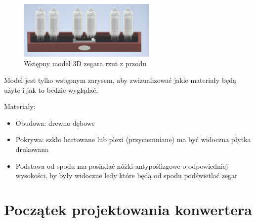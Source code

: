 \documentclass{article}
\begin{document}
\begin{figure}[H]
    \centering
    \includegraphics[width=0.6\textwidth]{model2.png}
    \caption{Wstępny model 3D zegara rzut z przodu}
\end{figure}

Model jest tylko wstępnym zarysem, aby zwizualizować jakie materiały będą użyte i jak to bedzie wyglądać.

Materiały:

\begin{itemize}
    \item Obudowa: drewno dębowe
    \item Pokrywa: szkło hartowane lub plexi (przyciemniane) ma być widoczna płytka drukowana
    \item Podstawa od spodu ma posiadać nóżki antypoślizgowe o odpowiedniej wysokości, by były widoczne ledy które będą od spodu podświetlać zegar
\end{itemize}

\section{Początek projektowania konwertera}
\end{document}
